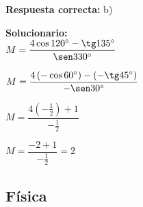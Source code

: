 \begin{enumerate}
	\textbf{Respuesta correcta:} b)
	
	\vspace{2mm}
	\textbf{Solucionario:}\\
	
	$
	M=\dfrac{4\cos120^\circ-\tg135^\circ}{\sen330^\circ}
	$
	
	$
	M=\dfrac{4\left(-\cos60^\circ\right)-\left(-\tg45^\circ\right)}{-\sen30^\circ}
	$
	
	$
	M=\dfrac{4\left(-\frac{1}{2}\right)+1}{-\frac{1}{2}}
	$
	
	$
	M=\dfrac{-2+1}{-\frac{1}{2}}=2
	$
	
	\vspace{6mm}
	
\end{enumerate}




\subsection*{Física}

